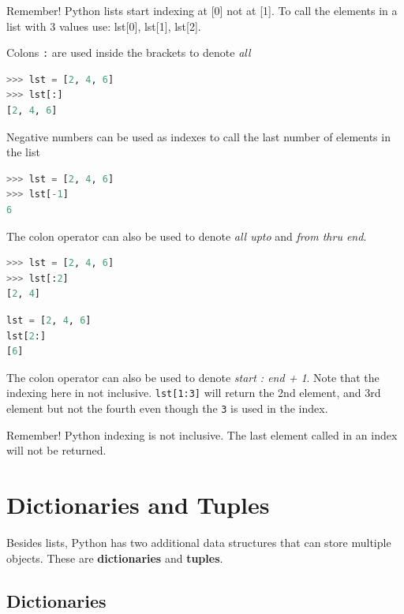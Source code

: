 \documentclass{book}
\begin{document}
Remember! Python lists start indexing at {[}0{]} not at {[}1{]}. To call
the elements in a list with 3 values use: lst{[}0{]}, lst{[}1{]},
lst{[}2{]}.

Colons \lstinline!:! are used inside the brackets to denote \emph{all}

\begin{lstlisting}[language=Python]
>>> lst = [2, 4, 6]
>>> lst[:]
[2, 4, 6]
\end{lstlisting}

Negative numbers can be used as indexes to call the last number of
elements in the list

\begin{lstlisting}[language=Python]
>>> lst = [2, 4, 6]
>>> lst[-1]
6
\end{lstlisting}

The colon operator can also be used to denote \emph{all upto} and
\emph{from thru end}.

\begin{lstlisting}[language=Python]
>>> lst = [2, 4, 6]
>>> lst[:2]
[2, 4]
\end{lstlisting}

\begin{lstlisting}[language=Python]
lst = [2, 4, 6]
lst[2:]
[6]
\end{lstlisting}

The colon operator can also be used to denote \emph{start : end + 1}.
Note that the indexing here in not inclusive. \lstinline!lst[1:3]! will
return the 2nd element, and 3rd element but not the fourth even though
the \lstinline!3! is used in the index.

Remember! Python indexing is not inclusive. The last element called in
an index will not be returned.
    




    
        \section{Dictionaries and Tuples}\label{dictionaries-and-tuples}
    




    
        Besides lists, Python has two additional data structures that can store
multiple objects. These are \textbf{dictionaries} and \textbf{tuples}.
    




    
        \subsection{Dictionaries}\label{dictionaries}
    
\end{document}
